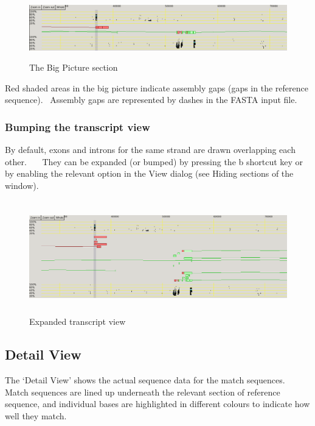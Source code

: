 \documentclass[letterpaper]{article}
\begin{document}
\bigskip

\begin{figure}
\centering
\color[rgb]{0.30980393,0.5058824,0.7411765}
\includegraphics[width=15.24cm,height=2.686cm]{img_view_big_picture.png}
\caption{The Big Picture section}
\end{figure}

{Red shaded areas in the big picture indicate assembly gaps (gaps in the
reference sequence). \ Assembly gaps are represented by dashes in the
FASTA input file.}

\bigskip

{\color[rgb]{0.30980393,0.5058824,0.7411765}\subsubsection[Bumping the transcript view]{Bumping the transcript view}}
{By default, exons and introns for the same strand are drawn overlapping
each other. \ \ \ They can be expanded (or
{\textquotesingle}bumped{\textquotesingle}) by pressing the
{\textquotesingle}b{\textquotesingle} shortcut key or by enabling the
relevant option in the View dialog (see Hiding sections of the
window).}

\bigskip

\begin{figure}
\centering
\color[rgb]{0.30980393,0.5058824,0.7411765}
\includegraphics[width=15.24cm,height=4.898cm]{img_view_transcripts.png}
\caption{Expanded transcript view}
\end{figure}

{\color[rgb]{0.30980393,0.5058824,0.7411765}\subsection[Detail View]{Detail View}}
{The {\textquoteleft}Detail View{\textquoteright} shows the actual
sequence data for the match sequences. Match sequences are lined up
underneath the relevant section of reference sequence, and individual
bases are highlighted in different colours to indicate how well they
match.}
\end{document}
